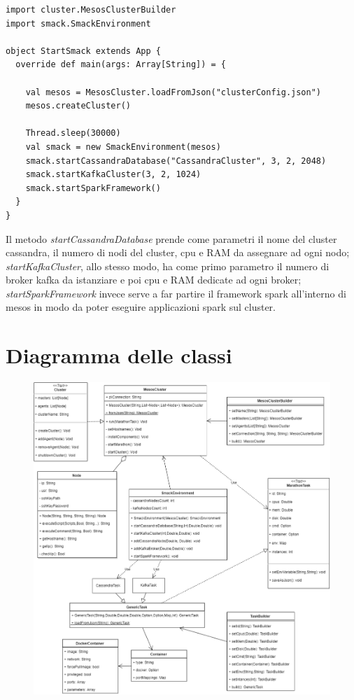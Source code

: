 \documentclass[12pt,a4paper]{article}
\begin{document}
\begin{lstlisting}[style=myScalastyle]
import cluster.MesosClusterBuilder
import smack.SmackEnvironment

object StartSmack extends App {
  override def main(args: Array[String]) = {
  
    val mesos = MesosCluster.loadFromJson("clusterConfig.json")
    mesos.createCluster()
    
    Thread.sleep(30000)
    val smack = new SmackEnvironment(mesos)
    smack.startCassandraDatabase("CassandraCluster", 3, 2, 2048)
    smack.startKafkaCluster(3, 2, 1024)
    smack.startSparkFramework()
  }
}
\end{lstlisting}
Il metodo \textit{startCassandraDatabase} prende come parametri il nome del cluster cassandra, il numero di nodi del cluster, cpu e RAM da assegnare ad ogni nodo;
\textit{startKafkaCluster}, allo stesso modo, ha come primo parametro il numero di broker kafka da istanziare e poi cpu e RAM dedicate ad ogni broker;
\textit{startSparkFramework} invece serve a far partire il framework spark all'interno di mesos in modo da poter eseguire applicazioni spark sul cluster.
\newpage
{}
\section{Diagramma delle classi}\label{sec:diagrammaClassi}
\begin{figure}[!h]
	\includegraphics[scale=0.5]{res/Class_Diagram_All.png}
\end{figure}
\end{document}
